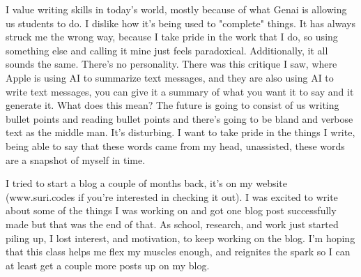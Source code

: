 \documentclass[12pt]{article}
\newenvironment{workscited}{\newpage \begin{center} Works Cited \end{center}}{\newpage }
\begin{document}
\begin{flushleft}
	I value writing skills in today's world, mostly because of what Genai is
	allowing us students to do. I dislike how it's being used to "complete"
	things. It has always struck me the wrong way, because I take pride in the work
	that I do, so using something else and calling it mine just feels paradoxical.
	Additionally, it all sounds the same. There's no personality. There was this
	critique I saw, where Apple is using AI to summarize text messages, and they are
	also using AI to write text messages, you can give it a summary of what you want
	it to say and it generate it. What does this mean? The future is going to
	consist of us writing bullet points and reading bullet points and there's
	going to be bland and verbose text as the middle man. It's disturbing. I want
	to take pride in the things I write, being able to say that these
	words came from my head, unassisted, these words are a snapshot of myself in time.

	I tried to start a blog a couple of months back, it's on my website (www.suri.codes if you're interested in checking it out).
	I was excited to write about some of the things I was working on and got one
	blog post successfully made but that was the end of that. As school, research, and work
	just started piling up, I lost interest, and motivation, to keep working on the blog.
	I'm hoping that this class helps me flex my muscles enough, and reignites the spark so
	I can at least get a couple more posts up on my blog.



	\newpage












\end{flushleft}
\end{document}
